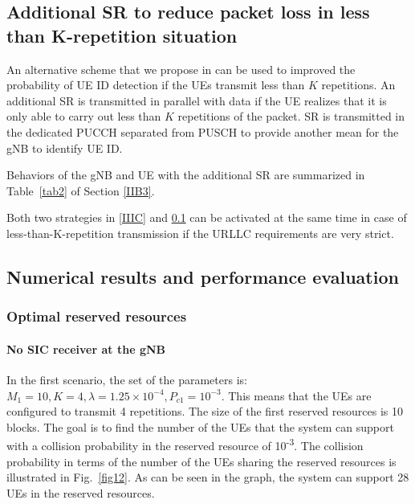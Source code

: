 \documentclass{ieeeaccess}
\begin{document}
\subsection{Additional SR to reduce packet loss in less than K-repetition situation}\label{IIID}

An alternative scheme that we propose in \cite{ad100} can be used to improved the probability of UE ID detection if the UEs transmit less than $K$ repetitions. An additional SR is transmitted in parallel with data if the UE realizes that it is only able to carry out less than $K$ repetitions of the packet. SR is transmitted in the dedicated PUCCH separated from PUSCH to provide another mean for the gNB to identify UE ID.

Behaviors of the gNB and UE with the additional SR are summarized in Table~\ref{tab2} of Section \ref{IIB3}. 

Both two strategies in \ref{IIIC} and \ref{IIID} can be activated at the same time in case of less-than-K-repetition transmission if the URLLC requirements are very strict.

\subsection{Numerical results and performance evaluation}\label{IV}

\subsubsection{Optimal reserved resources}
\paragraph{No SIC receiver at the gNB}\label{IVB1}
In the first scenario, the set of the parameters is: $M_1=10, K=4, \lambda=1.25\times10^{-4}, P_{c1}=10^{-3}$.  This means that the UEs are configured to transmit 4 repetitions. The size of the first reserved resources is 10 blocks. The goal is to find the number of the UEs that the system can support with a collision probability in the reserved resource of 10\textsuperscript{-3}. The collision probability in terms of the number of the UEs sharing the reserved resources is illustrated in Fig.~\ref{fig12}. As can be seen in the graph, the system can support 28 UEs in the reserved resources.
\end{document}
